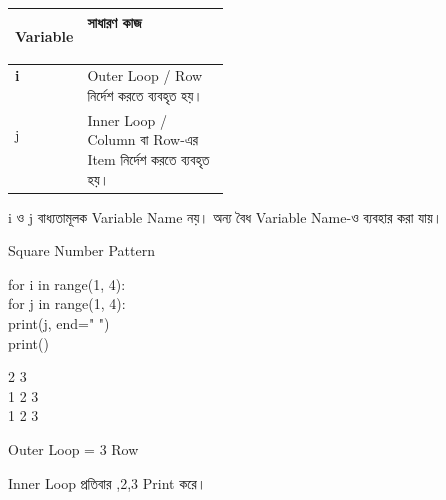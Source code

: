 \begin{tabularx}
{\linewidth}
{
|>{\bfseries\centering\arraybackslash}p{0.25\linewidth}
|Y|
}

\hline
{}

\textbf{Variable}
&
\textbf{সাধারণ কাজ}
\\
\hline

\textenglish{\ttfamily i}
&
Outer Loop / Row নির্দেশ করতে ব্যবহৃত হয়।
\\
\hline

\textenglish{\ttfamily j}
&
Inner Loop / Column বা Row-এর Item নির্দেশ করতে ব্যবহৃত হয়।
\\
\hline

\end{tabularx}

\begin{rememberbox}

\textenglish{\ttfamily i}
ও
\textenglish{\ttfamily j}
বাধ্যতামূলক Variable Name নয়।
অন্য বৈধ Variable Name-ও ব্যবহার করা যায়।

\end{rememberbox}



\begin{codeoutputbox}{Square Number Pattern}

\noindent
\begin{minipage}[t]{0.53\linewidth}
\codeheading

\begin{english}
\ttfamily
for i in range(1, 4):\\
\hspace*{4mm}for j in range(1, 4):\\
\hspace*{8mm}print(j, end=" ")\\
\hspace*{4mm}print()
\end{english}

\end{minipage}
\hfill
\begin{minipage}[t]{0.43\linewidth}
\outputheading

\begin{english}
 2 3\\
1 2 3\\
1 2 3
\end{english}

\medskip

Outer Loop = 3 Row

Inner Loop প্রতিবার
\textenglish{,2,3}
Print করে।

\end{minipage}

\end{codeoutputbox}

